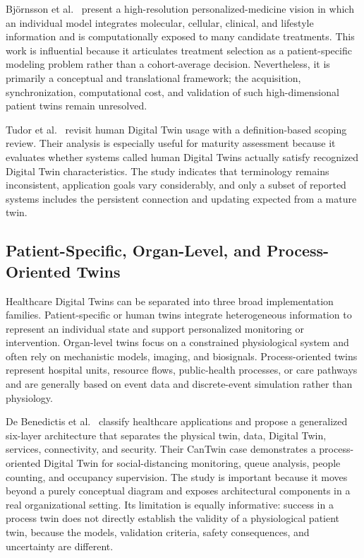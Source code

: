 Bj\"ornsson et al.~\cite{bjornsson2020digital} present a high-resolution personalized-medicine vision in which an individual model integrates molecular, cellular, clinical, and lifestyle information and is computationally exposed to many candidate treatments. This work is influential because it articulates treatment selection as a patient-specific modeling problem rather than a cohort-average decision. Nevertheless, it is primarily a conceptual and translational framework; the acquisition, synchronization, computational cost, and validation of such high-dimensional patient twins remain unresolved.

Tudor et al.~\cite{tudor2025scoping} revisit human Digital Twin usage with a definition-based scoping review. Their analysis is especially useful for maturity assessment because it evaluates whether systems called human Digital Twins actually satisfy recognized Digital Twin characteristics. The study indicates that terminology remains inconsistent, application goals vary considerably, and only a subset of reported systems includes the persistent connection and updating expected from a mature twin.

\subsection{Patient-Specific, Organ-Level, and Process-Oriented Twins}
Healthcare Digital Twins can be separated into three broad implementation families. Patient-specific or human twins integrate heterogeneous information to represent an individual state and support personalized monitoring or intervention. Organ-level twins focus on a constrained physiological system and often rely on mechanistic models, imaging, and biosignals. Process-oriented twins represent hospital units, resource flows, public-health processes, or care pathways and are generally based on event data and discrete-event simulation rather than physiology.

De Benedictis et al.~\cite{debenedictis2023digital} classify healthcare applications and propose a generalized six-layer architecture that separates the physical twin, data, Digital Twin, services, connectivity, and security. Their CanTwin case demonstrates a process-oriented Digital Twin for social-distancing monitoring, queue analysis, people counting, and occupancy supervision. The study is important because it moves beyond a purely conceptual diagram and exposes architectural components in a real organizational setting. Its limitation is equally informative: success in a process twin does not directly establish the validity of a physiological patient twin, because the models, validation criteria, safety consequences, and uncertainty are different.

